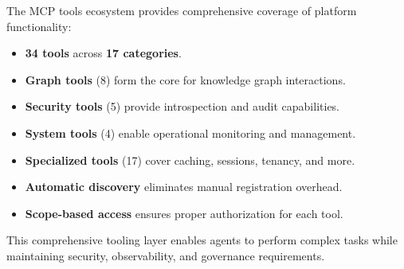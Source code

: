 The MCP tools ecosystem provides comprehensive coverage of platform functionality:

\begin{itemize}
    \item \textbf{34 tools} across \textbf{17 categories}.
    \item \textbf{Graph tools} (8) form the core for knowledge graph interactions.
    \item \textbf{Security tools} (5) provide introspection and audit capabilities.
    \item \textbf{System tools} (4) enable operational monitoring and management.
    \item \textbf{Specialized tools} (17) cover caching, sessions, tenancy, and more.
    \item \textbf{Automatic discovery} eliminates manual registration overhead.
    \item \textbf{Scope-based access} ensures proper authorization for each tool.
\end{itemize}

This comprehensive tooling layer enables agents to perform complex tasks while maintaining security, observability, and governance requirements.
